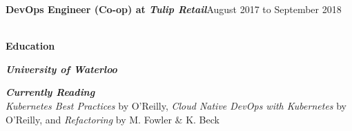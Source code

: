 \documentclass[9pt]{extarticle}
\begin{document}
{    \textbf{{\firamedium DevOps Engineer (Co-op) at \textit{Tulip Retail}}}{\color{darkgrey}\hfill{\small{August 2017 to September 2018\\[-5pt]}}
    }

    {\color{lightgrey}{\centerline{\rule{17cm}{0.4pt}}}}
    \begin{LARGE}
        \color{em-light}\textbf{\\[-5pt]{\firamedium Education}\\[-15pt]}
    \end{LARGE}

    \textit{\textbf{{\firamedium University of Waterloo}}}{\\[-20pt]}
    
    \textit{\textbf{{\firamedium Currently Reading}}}{\color{darkgrey}\\[0pt]
    {\textit{Kubernetes Best Practices}} by O'Reilly, {\textit{Cloud Native DevOps with Kubernetes}} by O'Reilly, and {\textit{Refactoring}} by M. Fowler \& K. Beck}
}
\end{document}
